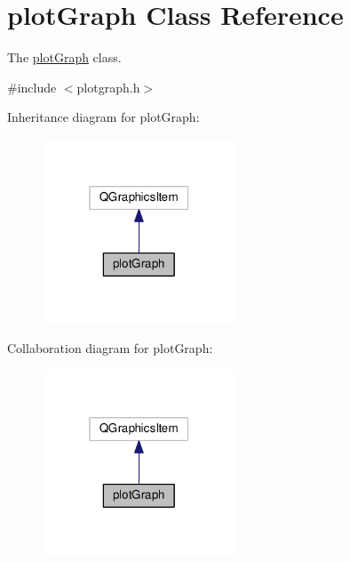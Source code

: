 \hypertarget{classplot_graph}{\section{plot\-Graph Class Reference}
\label{classplot_graph}
}


The \hyperlink{classplot_graph}{plot\-Graph} class.  




{\ttfamily \#include $<$plotgraph.\-h$>$}



Inheritance diagram for plot\-Graph\-:\nopagebreak
\begin{figure}[H]
\begin{center}
\leavevmode
\includegraphics[width=163pt]{classplot_graph__inherit__graph}
\end{center}
\end{figure}


Collaboration diagram for plot\-Graph\-:\nopagebreak
\begin{figure}[H]
\begin{center}
\leavevmode
\includegraphics[width=163pt]{classplot_graph__coll__graph}
\end{center}
\end{figure}
